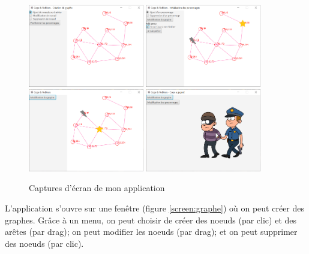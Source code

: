 \documentclass[12pt]{article}
\begin{document}
\begin{figure}[h!]
    \centering
        {\includegraphics[width=0.45\textwidth]{modif_graphe2.PNG}}
        {\includegraphics[width=0.45\textwidth]{modif_perso.PNG}}
        {\includegraphics[width=0.45\textwidth]{modif_jeu.PNG}}
        {\includegraphics[width=0.45\textwidth]{perdu_fenetre.PNG}}
    \caption{Captures d'écran de mon application}
    \label{fig:screenshots}
\end{figure}

L'application s'ouvre sur une fenêtre (figure \ref{screen:graphe}) où on peut créer des graphes. Grâce à un menu, on peut choisir de créer des noeuds (par clic) et des arêtes (par drag); on peut modifier les noeuds (par drag); et on peut supprimer des noeuds (par clic).
\end{document}

